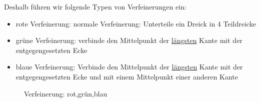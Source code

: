 Deshalb führen wir folgende Typen von Verfeinerungen ein:
\begin{itemize}
	\item \color{red}rote Verfeinerung\color{black}: normale Verfeinerung: Unterteile ein Dreick in 4 Teildreicke
	\item \color{green}grüne Verfeinerung\color{black}: verbinde den Mittelpunkt der \ul{längsten} Kante mit der entgegengesetzten Ecke
	\item \color{blue}blaue Verfeinerung\color{black}: Verbinde den Mittelpunkt der \underline{längsten} Kante mit der entgegengesetzten Ecke und mit einem Mittelpunkt einer anderen Kante
\end{itemize}

\begin{figure}[H]
	\center
	
	\caption{Verfeinerung: rot,grün,blau}
	\label{AbbRefinement_types}
\end{figure}	
	
